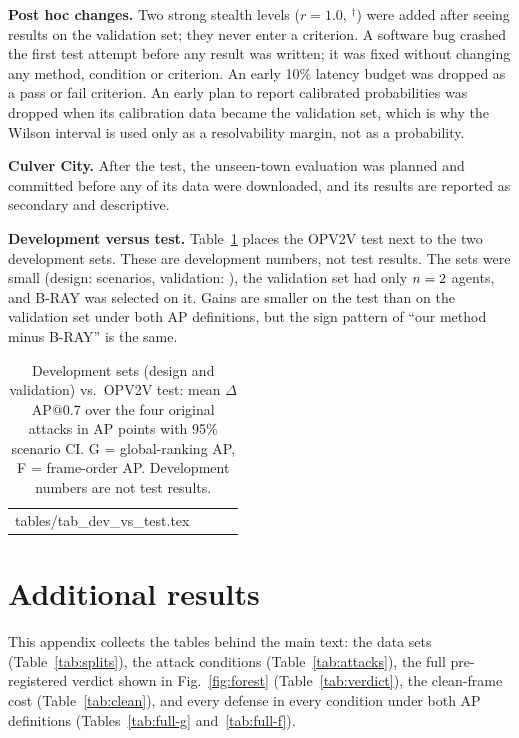 \documentclass[conference]{IEEEtran}
\makeatletter
\newcommand{\tabin}[1]{\@@input #1 }
\makeatother
\begin{document}
\textbf{Post hoc changes.} Two strong stealth levels ($r=1.0$, $^\dagger$) were added after seeing results on
the validation set; they never enter a criterion. A software bug crashed the first test attempt before any
result was written; it was fixed without changing any method, condition or criterion. An early 10\% latency
budget was dropped as a pass or fail criterion. An early plan to report calibrated probabilities was dropped
when its calibration data became the validation set, which is why the Wilson interval is used only as a
resolvability margin, not as a probability.

\textbf{Culver City.} After the test, the unseen-town evaluation was planned and committed before any of its
data were downloaded, and its results are reported as secondary and descriptive.

\textbf{Development versus test.} \label{app:devtest} Table~\ref{tab:devtest} places the OPV2V test next to the two development sets. These are development
numbers, not test results. The sets were small (design: \DevTScenarios{} scenarios, validation:
\DevHScenarios), the validation set had only $n=2$ agents, and B-RAY was selected on it. Gains are smaller
on the test than on the validation set under both AP
definitions, but the sign pattern of ``our method minus B-RAY'' is the same.

\begin{table}[!htb]
\caption{Development sets (design and validation) vs.\ OPV2V test: mean $\Delta$AP@0.7 over the four original
attacks in AP points with 95\% scenario CI. G = global-ranking AP, F = frame-order AP. Development numbers are
not test results.}
\label{tab:devtest}
\centering
\scriptsize
\setlength{\tabcolsep}{2.2pt}
\begin{tabular}{@{}lccc@{}}
\toprule
\tabin{tables/tab_dev_vs_test.tex}
\bottomrule
\end{tabular}
\end{table}
\FloatBarrier

\section{Additional results}
\label{app:tables}
\label{app:full}
This appendix collects the tables behind the main text: the data sets (Table~\ref{tab:splits}), the attack
conditions (Table~\ref{tab:attacks}), the full pre-registered verdict shown in Fig.~\ref{fig:forest}
(Table~\ref{tab:verdict}), the clean-frame cost (Table~\ref{tab:clean}), and every defense in every condition
under both AP definitions (Tables~\ref{tab:full-g} and~\ref{tab:full-f}).
\end{document}
